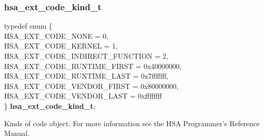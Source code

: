 \documentclass[final,oneside]{book}
\newcommand{\reftyp}[1]{#1}
\newcommand{\refenu}[1]{\reftyp{#1}}
\newenvironment{mylongtable}{\rowcolors{0}{lightgray}{lightgray}\longtable} {
\endlongtable}
\begin{document}
\subsubsection{hsa_\-ext_\-code_\-kind_\-t}
\vspace{-5.5mm}\begin{mylongtable}{@{}p{\textwidth}}
\rule{0pt}{3ex}typedef enum \{\\\hspace{1.7em}\hypertarget{group__ext-finalizer_1gga3a26aac857ef4f02699a2ed8a4c425e3aa692c691cdb10a56486a1e8d246414e3}{\refenu{HSA_\-EXT_\-CODE_\-NONE}} = 0,\\
\hspace{1.7em}\hypertarget{group__ext-finalizer_1gga3a26aac857ef4f02699a2ed8a4c425e3a5c83ef1db7eaa20cdf2612ba26e316cc}{\refenu{HSA_\-EXT_\-CODE_\-KERNEL}} = 1,\\
\hspace{1.7em}\hypertarget{group__ext-finalizer_1gga3a26aac857ef4f02699a2ed8a4c425e3a5f810d8ab0aae6b7f5af079857bbb14c}{\refenu{HSA_\-EXT_\-CODE_\-INDIRECT_\-FUNCTION}} = 2,\\
\hspace{1.7em}\hypertarget{group__ext-finalizer_1gga3a26aac857ef4f02699a2ed8a4c425e3afe329fae97936c684cd1e7df360c7160}{\refenu{HSA_\-EXT_\-CODE_\-RUNTIME_\-FIRST}} = 0x40000000,\\
\hspace{1.7em}\hypertarget{group__ext-finalizer_1gga3a26aac857ef4f02699a2ed8a4c425e3a9c49857996a8d326eabb3080b9e38972}{\refenu{HSA_\-EXT_\-CODE_\-RUNTIME_\-LAST}} = 0x7fffffff,\\
\hspace{1.7em}\hypertarget{group__ext-finalizer_1gga3a26aac857ef4f02699a2ed8a4c425e3aefd6d814296d049b06ab2de301cd10b1}{\refenu{HSA_\-EXT_\-CODE_\-VENDOR_\-FIRST}} = 0x80000000,\\
\hspace{1.7em}\hypertarget{group__ext-finalizer_1gga3a26aac857ef4f02699a2ed8a4c425e3accaced1295912da1748d70c5abde593b}{\refenu{HSA_\-EXT_\-CODE_\-VENDOR_\-LAST}} = 0xffffffff\\
\} \hypertarget{group__ext-finalizer_1ga3a26aac857ef4f02699a2ed8a4c425e3}{\textbf{hsa_\-ext_\-code_\-kind_\-t}};\rule[-2ex]{0pt}{0pt}\end{mylongtable}
\vspace{-5mm}Kinds of code object. For more information see the HSA Programmer's Reference Manual.
\end{document}
